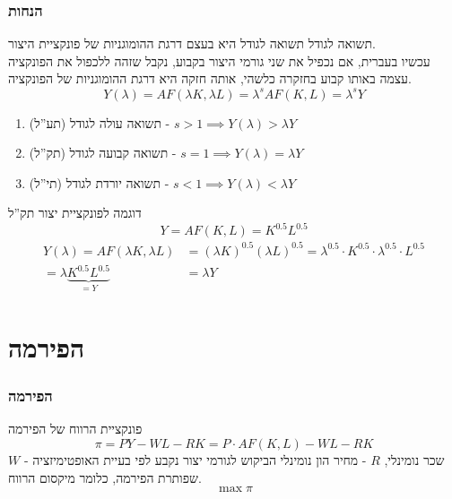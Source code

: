 \documentclass[usenames,dvipsnames]{beamer}
\begin{document}
\begin{RTL}
\begin{frame}
    \end{frame}

    \begin{frame}[allowframebreaks]
        \frametitle{הנחות}
        \begin{block}{תשואה לגודל}
            תשואה לגודל היא בעצם דרגת ההומוגניות של פונקציית היצור. \\ 
            עכשיו בעברית, אם נכפיל את שני גורמי היצור בקבוע, נקבל שזהה ללכפול את הפונקציה עצמה באותו קבוע בחזקרה כלשהי, אותה חזקה היא דרגת ההומוגניות של הפונקציה.
            $$Y(\lambda) = AF(\lambda K, \lambda L) = \lambda^{s} AF(K,L) = \lambda^s Y $$
        \end{block}

        \begin{enumerate}
            \item תשואה עולה לגודל (תע''ל) - $s>1 \implies Y(\lambda) > \lambda Y $ 
            \item תשואה קבועה לגודל (תק''ל) - $s = 1 \implies Y(\lambda) = \lambda Y $
            \item תשואה יורדת לגודל (תי''ל) - $s<1 \implies Y(\lambda) < \lambda Y $
        \end{enumerate}
        
        \framebreak

        \begin{exampleblock}{דוגמה לפונקציית יצור תק''ל} 
            $$Y = AF(K,L) = K^{0.5} L^{0.5}$$
        \begin{align*}
            Y(\lambda) = AF(\lambda K , \lambda L ) &= (\lambda K )^{0.5} (\lambda L ) ^{0.5} = \lambda^{0.5} \cdot K ^{0.5} \cdot  \lambda ^{0.5} \cdot L ^{0.5} \\ =\lambda \underbrace{K^{0.5} L^{0.5}}_{=Y} &= \lambda Y
        \end{align*}
            
        \end{exampleblock}
    
    \end{frame}

    \section{הפירמה }
    \begin{frame}[allowframebreaks]
        \frametitle{הפירמה}
        \begin{block}{פונקציית הרווח של הפירמה}
            $$\pi = PY - WL - RK = P \cdot AF(K,L) - WL - RK $$
            $W$ - שכר נומינלי, $R$ - מחיר הון נומינלי
            הביקוש לגורמי יצור נקבע לפי בעיית האופטימיזציה שפותרת הפירמה, כלומר מיקסום הרווח.
            $$\max \pi$$


\end{block}
\end{frame}
\end{RTL}
\end{document}
